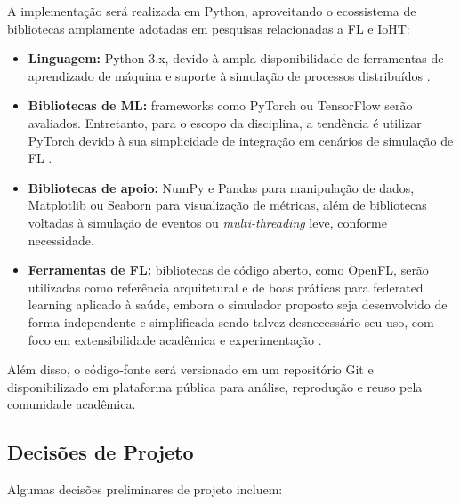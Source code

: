 \documentclass[12pt]{article}
\begin{document}
A implementação será realizada em Python, aproveitando o ecossistema de bibliotecas amplamente adotadas em pesquisas relacionadas a FL e IoHT:

\begin{itemize}
    \item \textbf{Linguagem:} Python 3.x, devido à ampla disponibilidade de ferramentas de aprendizado de máquina e suporte à simulação de processos distribuídos \cite{Intel2020_OpenFLTutorial}.
    
    \item \textbf{Bibliotecas de ML:} frameworks como PyTorch ou TensorFlow serão avaliados. Entretanto, para o escopo da disciplina, a tendência é utilizar PyTorch devido à sua simplicidade de integração em cenários de simulação de FL \cite{Intel2020_OpenFLTutorial}.
    
    \item \textbf{Bibliotecas de apoio:} NumPy e Pandas para manipulação de dados, Matplotlib ou Seaborn para visualização de métricas, além de bibliotecas voltadas à simulação de eventos ou \textit{multi-threading} leve, conforme necessidade.
    
    \item \textbf{Ferramentas de FL:} bibliotecas de código aberto, como OpenFL, serão utilizadas como referência arquitetural e de boas práticas para federated learning aplicado à saúde, embora o simulador proposto seja desenvolvido de forma independente e simplificada sendo talvez desnecessário seu uso, com foco em extensibilidade acadêmica e experimentação \cite{Intel2020_OpenFLTutorial}.
\end{itemize}

Além disso, o código-fonte será versionado em um repositório Git e disponibilizado em plataforma pública para análise, reprodução e reuso pela comunidade acadêmica.

\subsection{Decisões de Projeto}

Algumas decisões preliminares de projeto incluem:
\end{document}
